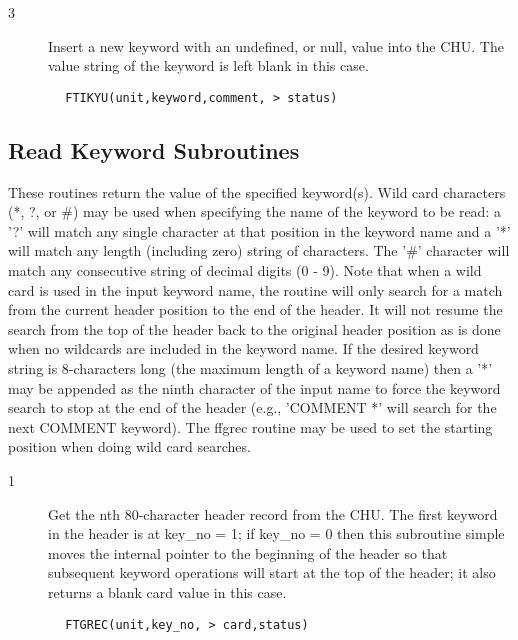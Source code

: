 \documentclass[11pt]{book}
\begin{document}
\begin{description}
\item[3 ] Insert a new keyword with an undefined, or null, value into the CHU.
   The value string of the keyword is left blank in this case.
\end{description}

\begin{verbatim}
        FTIKYU(unit,keyword,comment, > status)
\end{verbatim}

\subsection{Read Keyword Subroutines \label{FTGREC}}

These routines return the value of the specified keyword(s).  Wild card
characters (*, ?, or \#) may be used when specifying the name of the keyword
to be read: a '?' will match any single character at that position in the
keyword name and a '*' will match any length (including zero) string of
characters.  The '\#' character will match any consecutive string of
decimal digits (0 - 9). Note that when a wild card is used in the input
keyword name, the routine will only search for a match from the current
header position to the end of the header.  It will not resume the search
from the top of the header back to the original header position as is done
when no wildcards are included in the keyword name.  If the desired
keyword string is 8-characters long (the maximum length of a keyword
name) then a '*' may be appended as the ninth character of the input
name to force the keyword search to stop at the end of the header
(e.g., 'COMMENT *' will search for the next COMMENT keyword).  The
ffgrec routine may be used to set the starting position when doing
wild card searches.


\begin{description}
\item[1 ]Get the nth 80-character header record from the CHU.  The first keyword
   in the header is at key\_no = 1;  if key\_no = 0 then this subroutine
   simple moves the internal pointer to the beginning of the header
   so that subsequent keyword operations will start at the top of
  the header; it also returns a blank card value in this case.
\end{description}

\begin{verbatim}
        FTGREC(unit,key_no, > card,status)
\end{verbatim}
\end{document}

